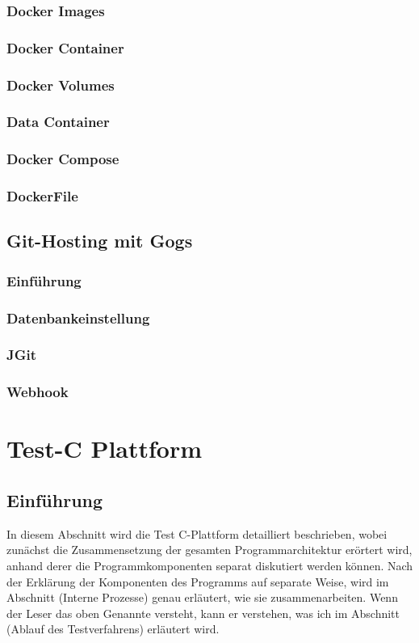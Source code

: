 \documentclass[apaper4,12p]{scrartcl}
\begin{document}
\subsubsection{Docker Images}
\subsubsection{Docker Container}
\subsubsection{Docker Volumes}
\subsubsection{Data Container}
\subsubsection{Docker Compose}
\subsubsection{DockerFile}
\subsection{Git-Hosting mit Gogs}
\subsubsection{Einführung}
\subsubsection{Datenbankeinstellung}
\subsubsection{JGit}
\subsubsection{Webhook}
\section{Test-C Plattform}
\subsection{Einführung}
In diesem Abschnitt wird die Test C-Plattform detailliert beschrieben, wobei zunächst die Zusammensetzung der gesamten Programmarchitektur erörtert wird, anhand derer die Programmkomponenten separat diskutiert werden können. Nach der Erklärung der Komponenten des Programms auf separate Weise, wird im Abschnitt (Interne Prozesse) genau erläutert, wie sie zusammenarbeiten.
\newline
Wenn der Leser das oben Genannte versteht, kann er verstehen, was ich im Abschnitt  (Ablauf des Testverfahrens) erläutert wird.
\end{document}
